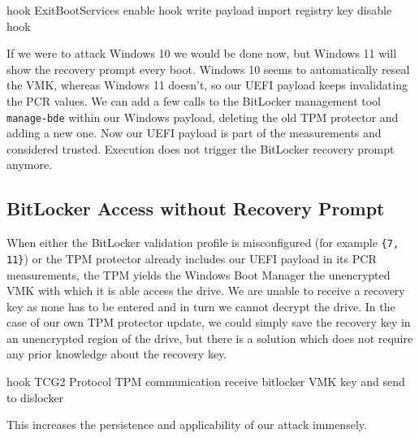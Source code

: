 \cite{exitbootservices-hooking}
hook ExitBootServices
enable hook
write payload
import registry key
disable hook


If we were to attack Windows 10 we would be done now, but Windows 11 will show the recovery prompt every boot.
Windows 10 seems to automatically reseal the \ac{VMK}, whereas Windows 11 doesn't, so our \ac{UEFI} payload keeps invalidating the \ac{PCR} values.
We can add a few calls to the BitLocker management tool \lstinline{manage-bde} \cite{microsoft-bitlocker-manage-bde} within our Windows payload, deleting the old \ac{TPM} protector and adding a new one.
Now our \ac{UEFI} payload is part of the measurements and considered trusted.
Execution does not trigger the BitLocker recovery prompt anymore.

\subsection{BitLocker Access without Recovery Prompt}
\label{sec:attacks:bitlocker:bitlocker-access-without-recovery-prompt}

When either the BitLocker validation profile is misconfigured (for example \lstinline|{7, 11}|) or the \ac{TPM} protector already includes our \ac{UEFI} payload in its \ac{PCR} measurements, the \ac{TPM} yields the Windows Boot Manager the unencrypted \ac{VMK} with which it is able access the drive.
We are unable to receive a recovery key as none has to be entered and in turn we cannot decrypt the drive.
In the case of our own \ac{TPM} protector update, we could simply save the recovery key in an unencrypted region of the drive, but there is a solution which does not require any prior knowledge about the recovery key.

hook \ac{TCG}2 Protocol \cite[Section 6.7.3]{tcg-efi-protocol-spec}
\ac{TPM} communication
receive bitlocker \ac{VMK} key and send to dislocker
\cite{bde-format-spec}
\cite{tpm-sniffing}

This increases the persistence and applicability of our attack immensely.